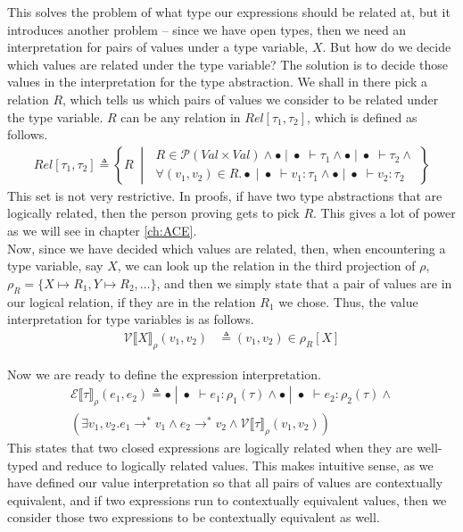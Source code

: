 \documentclass[a4paper, 11pt]{report}
\theoremstyle{definition}
\newcommand{\expr}{e}
\newcommand{\val}{v}
\newcommand{\Tvar}{X}
\newcommand{\TvarB}{Y}
\newcommand{\typ}{\tau}
\newcommand{\emptenv}{\bullet}
\newcommand{\empvenv}{\bullet}
\newcommand{\jdg}[4]{#1 \; | \; #2 \; \vdash #3 : #4}
\newcommand{\jdgType}[3]{#1 \; | \; #2 \; \vdash #3}
\newcommand{\stepS}{\rightarrow^*}
\newcommand{\ValInp}[2]{\mathcal{V} \llbracket #1 \rrbracket_{#2}}
\newcommand{\ValInpGen}[2]{\ValInp{#1}{#2}(\val_1, \val_2)}
\newcommand{\ExpInp}[2]{\mathcal{E} \llbracket #1 \rrbracket_{#2}}
\begin{document}
This solves the problem of what type our expressions should be related at, but it introduces another problem – since we have open types, then we need an interpretation for pairs of values under a type variable, $\Tvar$. But how do we decide which values are related under the type variable? The solution is to decide those values in the interpretation for the type abstraction. We shall in there pick a relation $R$, which tells us which pairs of values we consider to be related under the type variable. $R$ can be any relation in $Rel[\typ_1, \typ_2]$, which is defined as follows.
\begin{align*}
  Rel[\typ_1, \typ_2] \triangleq 
  \left\{R \; \middle\vert \;
  \begin{aligned}
    R \in \mathcal{P}(Val \times Val) \land \jdgType{\emptenv}{\empvenv}{\typ_1} \land \jdgType{\emptenv}{\empvenv}{\typ_2} \land\\ \forall (\val_1, \val_2) \in R . \jdg{\emptenv}{\empvenv}{\val_1}{\typ_1} \land \jdg{\emptenv}{\empvenv}{\val_2}{\typ_2}
  \end{aligned}
  \right\}
\end{align*}
This set is not very restrictive. In proofs, if have two type abstractions that are logically related, then the person proving gets to pick $R$. This gives a lot of power as we will see in chapter \ref{ch:ACE}.\\
Now, since we have decided which values are related, then, when encountering a type variable, say $\Tvar$, we can look up the relation in the third projection of $\rho$, $\rho_R = \{\Tvar \mapsto R_1, \TvarB \mapsto R_2, \dots\}$, and then we simply state that a pair of values are in our logical relation, if they are in the relation $R_1$ we chose. Thus, the value interpretation for type variables is as follows.
\begin{align*}
  \ValInpGen{\Tvar}{\rho} &\triangleq (\val_1, \val_2) \in \rho_R[\Tvar]
\end{align*}

Now we are ready to define the expression interpretation.
\begin{multline*}
  \ExpInp{\typ}{\rho}(\expr_1, \expr_2) \triangleq
    \jdg{\emptenv}{\empvenv}{\expr_1}{\rho_1(\typ)} \land \jdg{\emptenv}{\empvenv}{\expr_2}{\rho_2(\typ)} \land\\
    (\exists \val_1, \val_2 . \expr_1 \stepS \val_1 \land \expr_2 \stepS \val_2 \land\ValInpGen{\typ}{\rho})
\end{multline*}
This states that two closed expressions are logically related when they are well-typed and reduce to logically related values. This makes intuitive sense, as we have defined our value interpretation so that all pairs of values are contextually equivalent, and if two expressions run to contextually equivalent values, then we consider those two expressions to be contextually equivalent as well.
\end{document}
